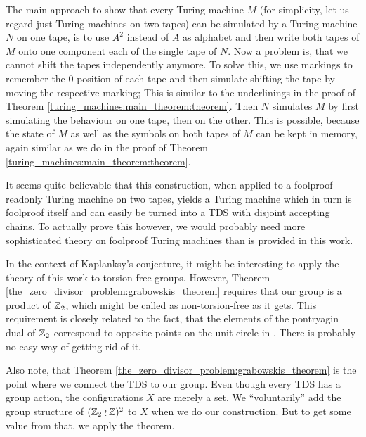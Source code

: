 \begin{Remark}
	The main approach to show that every Turing machine $M$ (for simplicity, let us regard just Turing machines on two tapes) can be simulated by a Turing machine $N$ on one tape, is to use $A^2$ instead of $A$ as alphabet and then write both tapes of $M$ onto one component each of the single tape of $N$.
	Now a problem is, that we cannot shift the tapes independently anymore.
	To solve this, we use markings to remember the $0$-position of each tape and then simulate shifting the tape by moving the respective marking; This is similar to the underlinings in the proof of Theorem \ref{turing_machines:main_theorem:theorem}.
	Then $N$ simulates $M$ by first simulating the behaviour on one tape, then on the other.
	This is possible, because the state of $M$ as well as the symbols on both tapes of $M$ can be kept in memory, again similar as we do in the proof of Theorem \ref{turing_machines:main_theorem:theorem}.

	It seems quite believable that this construction, when applied to a foolproof readonly Turing machine on two tapes, yields a Turing machine which in turn is foolproof itself and can easily be turned into a TDS with disjoint accepting chains.
	To actually prove this however, we would probably need more sophisticated theory on foolproof Turing machines than is provided in this work.
\end{Remark}

\begin{Remark}
	\label{remarks:torsion_free_groups}
	In the context of Kaplanksy's conjecture, it might be interesting to apply the theory of this work to torsion free groups.
	However, Theorem \ref{the_zero_divisor_problem:grabowskis_theorem} requires that our group is a product of $\mathbb{Z}_2$, which might be called as non-torsion-free as it gets.
	This requirement is closely related to the fact, that the elements of the pontryagin dual of $\mathbb{Z}_2$ correspond to opposite points on the unit circle in \C.
	There is probably no easy way of getting rid of it.

	Also note, that Theorem \ref{the_zero_divisor_problem:grabowskis_theorem} is the point where we connect the TDS to our group.
	Even though every TDS has a group action, the configurations $X$ are merely a set.
	We ``voluntarily'' add the group structure of $(\mathbb{Z}_2 \wr \mathbb{Z})^2$ to $X$ when we do our construction.
	But to get some value from that, we apply the theorem.
\end{Remark}


